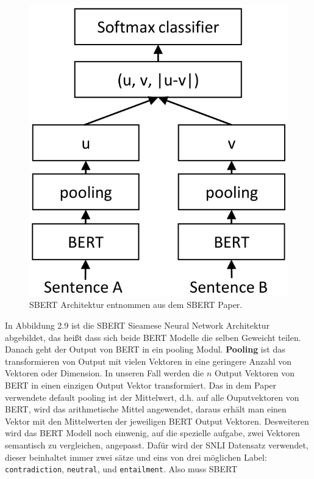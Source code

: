 \documentclass[12pt,letterpaper,ngerman]{article}
\begin{document}
\begin{figure}[H]
  \begin{center}
    \includegraphics[scale=0.3]{abb/SBERT.png}
  \end{center}
  \caption{SBERT Architektur entnommen aus dem SBERT Paper.}
\end{figure}
In Abbildung 2.9 ist die SBERT Sieamese Neural Network Architektur abgebildet,
das heißt dass sich beide BERT Modelle die selben Geweicht teilen. Danach
geht der Output von BERT in ein pooling Modul. {\bf Pooling} ist das transformieren
von Output mit vielen Vektoren in eine geringere Anzahl von Vektoren oder 
Dimension. In unseren Fall werden die $n$ Output Vektoren von BERT in einen 
einzigen Output Vektor transformiert. Das in dem Paper verwendete
default pooling ist der Mittelwert, d.h. auf alle Ouputvektoren von BERT,
wird das arithmetische Mittel angewendet, daraus erhält man einen Vektor
mit den Mittelwerten der jeweiligen BERT Output Vektoren. Desweiteren wird
das BERT Modell noch einwenig, auf die spezielle aufgabe, zwei Vektoren
semantisch zu vergleichen, angepasst. Dafür wird der SNLI Datensatz verwendet,
dieser beinhaltet immer zwei sätze und eins von drei möglichen Label:
\verb|contradiction|, \verb|neutral|, und \verb|entailment|. Also muss SBERT
\end{document}

